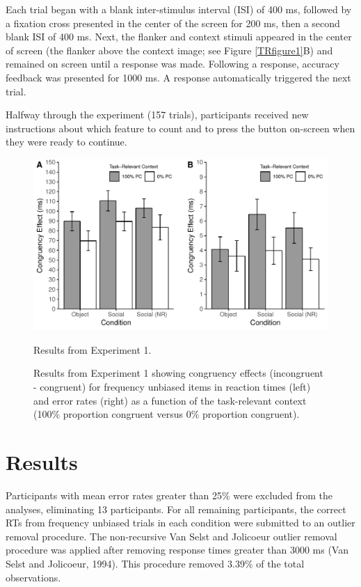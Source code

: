 \documentclass[]{DissertateCUNY}
\begin{document}
Each trial began with a blank inter-stimulus interval (ISI) of 400 ms,
followed by a fixation cross presented in the center of the screen for
200 ms, then a second blank ISI of 400 ms. Next, the flanker and context
stimuli appeared in the center of screen (the flanker above the context
image; see Figure \ref{TRfigure1}B) and remained on screen until a
response was made. Following a response, accuracy feedback was presented
for 1000 ms. A response automatically triggered the next trial.

Halfway through the experiment (157 trials), participants received new
instructions about which feature to count and to press the button
on-screen when they were ready to continue.

\begin{figure}
  \centering
  \includegraphics[width=5in]{figures/TRfigure2.pdf}
  \caption{Results from Experiment 1.}
  \caption*{Results from Experiment 1 showing congruency effects (incongruent - congruent) for frequency unbiased items in reaction times (left) and error rates (right) as a function of the task-relevant context (100\% proportion congruent versus 0\% proportion congruent).}
  \label{TR_figure2}
\end{figure}

\hypertarget{results-7}{%
\section{Results}\label{results-7}}

Participants with mean error rates greater than 25\% were excluded from
the analyses, eliminating 13 participants. For all remaining
participants, the correct RTs from frequency unbiased trials in each
condition were submitted to an outlier removal procedure. The
non-recursive Van Selst and Jolicoeur outlier removal procedure was
applied after removing response times greater than 3000 ms (Van Selst
and Jolicoeur, 1994). This procedure removed 3.39\% of the total
observations.
\end{document}
